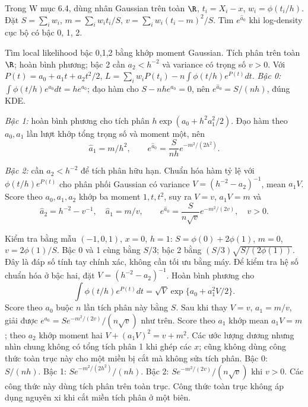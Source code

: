 \begin{problem}\label{k:53}
Trong W mục 6.4, dùng nhân Gaussian trên toàn $\R$, $t_i=X_i-x$, $w_i=\phi(t_i/h)$. Đặt $S=\sum_iw_i$, $m=\sum_iw_it_i/S$, $v=\sum_iw_i(t_i-m)^2/S$. Tìm $e^{\widehat a_0}$ khi log-density cục bộ có bậc 0, 1, 2.
\end{problem}
\begin{solution}
Tìm local likelihood bậc 0,1,2 bằng khớp moment Gaussian.
Tích phân trên toàn $\R$; hoàn bình phương; bậc 2 cần $a_2<h^{-2}$ và variance có trọng số $v>0$.
Với $P(t)=a_0+a_1t+a_2t^2/2$,
$L=\sum_iw_iP(t_i)-n\int\phi(t/h)e^{P(t)}dt$.
\emph{Bậc 0:} $\int\phi(t/h)e^{a_0}dt=he^{a_0}$; đạo hàm cho $S-nhe^{a_0}=0$, nên $e^{\widehat a_0}=S/(nh)$, đúng KDE.

\emph{Bậc 1:} hoàn bình phương cho tích phân $h\exp(a_0+h^2a_1^2/2)$.
Đạo hàm theo $a_0,a_1$ lần lượt khớp tổng trọng số và moment một, nên
\[
 \widehat a_1=m/h^2,\qquad e^{\widehat a_0}=\frac{S}{nh}e^{-m^2/(2h^2)}.
\]

\emph{Bậc 2:} cần $a_2<h^{-2}$ để tích phân hữu hạn. Chuẩn hóa hàm tỷ lệ với $\phi(t/h)e^{P(t)}$ cho phân phối Gaussian có variance $V=(h^{-2}-a_2)^{-1}$, mean $a_1V$. Score theo $a_0,a_1,a_2$ khớp ba moment $1,t,t^2$, suy ra $V=v$, $a_1V=m$ và
\[
 \widehat a_2=h^{-2}-v^{-1},\quad\widehat a_1=m/v,\qquad
 e^{\widehat a_0}=\frac{S}{n\sqrt v}e^{-m^2/(2v)},\quad v>0.
\]

Kiểm tra bằng mẫu $(-1,0,1)$, $x=0$, $h=1$: $S=\phi(0)+2\phi(1)$, $m=0$, $v=2\phi(1)/S$.
Bậc 0 và 1 cùng bằng $S/3$; bậc 2 bằng $(S/3)\sqrt{S/(2\phi(1))}$. Đây là đáp số tính tay chính xác, không cần tối ưu bằng máy.
Để kiểm tra hệ số chuẩn hóa ở bậc hai, đặt $V=(h^{-2}-a_2)^{-1}$. Hoàn bình phương cho
\[
 \int\phi(t/h)e^{P(t)}dt
 =\sqrt V\exp\{a_0+a_1^2V/2\}.
\]
Score theo $a_0$ buộc $n$ lần tích phân này bằng $S$. Sau khi thay $V=v$, $a_1=m/v$, giải được $e^{a_0}=S e^{-m^2/(2v)}/(n\sqrt v)$ như trên. Score theo $a_1$ khớp mean $a_1V=m$; theo $a_2$ khớp moment hai $V+(a_1V)^2=v+m^2$.
Các ước lượng dương nhưng nhìn chung không có tổng tích phân 1 khi ghép các $x$; cũng không dùng công thức toàn trục này cho một miền bị cắt mà không sửa tích phân.
Bậc 0: $S/(nh)$. Bậc 1: $S e^{-m^2/(2h^2)}/(nh)$. Bậc 2: $S e^{-m^2/(2v)}/(n\sqrt v)$ khi $v>0$. Các công thức này dùng tích phân trên toàn trục.
Công thức toàn trục không áp dụng nguyên xi khi cắt miền tích phân ở một biên.
\end{solution}

